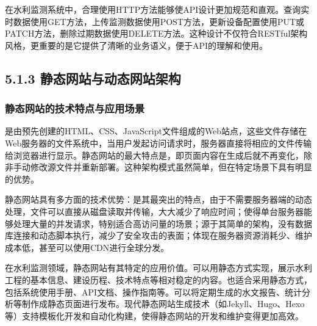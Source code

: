 在水利监测系统中，合理使用HTTP方法能够使API设计更加规范和直观。查询实时数据使用GET方法，上传监测数据使用POST方法，更新设备配置使用PUT或PATCH方法，删除过期数据使用DELETE方法。这种设计不仅符合RESTful架构风格，更重要的是它提供了清晰的业务语义，便于API的理解和使用。

\hypertarget{ux9759ux6001ux7f51ux7ad9ux4e0eux52a8ux6001ux7f51ux7ad9ux67b6ux6784}{%
\subsection{5.1.3 静态网站与动态网站架构}\label{ux9759ux6001ux7f51ux7ad9ux4e0eux52a8ux6001ux7f51ux7ad9ux67b6ux6784}}

\hypertarget{ux9759ux6001ux7f51ux7ad9ux7684ux6280ux672fux7279ux70b9ux4e0eux5e94ux7528ux573aux666f}{%
\subsubsection{静态网站的技术特点与应用场景}\label{ux9759ux6001ux7f51ux7ad9ux7684ux6280ux672fux7279ux70b9ux4e0eux5e94ux7528ux573aux666f}}

是由预先创建的HTML、CSS、JavaScript文件组成的Web站点，这些文件存储在Web服务器的文件系统中，当用户发起访问请求时，服务器直接将相应的文件传输给浏览器进行显示。静态网站的最大特点是，即页面内容在生成后就不再变化，除非手动修改源文件并重新部署。这种架构模式虽然简单，但在特定场景下具有明显的优势。

静态网站具有多方面的技术优势：是其最突出的特点，由于不需要服务器端的动态处理，文件可以直接从磁盘读取并传输，大大减少了响应时间；使得单台服务器能够处理大量的并发请求，特别适合高访问量的场景；源于其简单的架构，没有数据库连接和动态脚本执行，减少了安全攻击的表面；体现在服务器资源消耗少、维护成本低，甚至可以使用CDN进行全球分发。

在水利监测领域，静态网站有其特定的应用价值。可以用静态方式实现，展示水利工程的基本信息、建设历程、技术特点等相对稳定的内容。也适合采用静态方式，包括系统使用手册、API文档、操作指南等。可以将定期生成的水文报告、统计分析等制作成静态页面进行发布。现代静态网站生成技术（如Jekyll、Hugo、Hexo等）支持模板化开发和自动化构建，使得静态网站的开发和维护变得更加高效。

